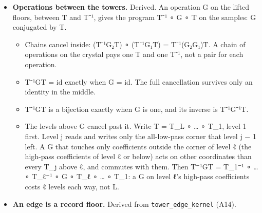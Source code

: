 \begin{itemize}
\begin{itemize}
\item keymath does not see the identity: T⁻¹ ∘ T emitted as steps runs every one of them.
\item In the proved program T is 69 steps (8 field steps and 61) and T⁻¹ is 60. F on the samples needs only the 8 field steps.
\item When the record holds the samples, F on the samples saves every step of T and T⁻¹.
\item When the record holds only the crystal, F ∘ T⁻¹ is the way down to the samples, and T⁻¹'s steps are its price.
\end{itemize}
\item \textbf{Operations between the towers.} Derived. An operation G on the lifted floors, between T and T⁻¹, gives the program T⁻¹ ∘ G ∘ T on the samples: G conjugated by T.

\begin{itemize}
\item Chains cancel inside: (T⁻¹G₂T) ∘ (T⁻¹G₁T) = T⁻¹(G₂G₁)T. A chain of operations on the crystal pays one T and one T⁻¹, not a pair for each operation.
\item T⁻¹GT = id exactly when G = id. The full cancellation survives only an identity in the middle.
\item T⁻¹GT is a bijection exactly when G is one, and its inverse is T⁻¹G⁻¹T.
\item The levels above G cancel past it. Write T = T\_\allowbreak{}L ∘ … ∘ T\_\allowbreak{}1, level 1 first. Level j reads and writes only the all-low-pass corner that level j − 1 left. A G that touches only coefficients outside the corner of level ℓ (the high-pass coefficients of level ℓ or below) acts on other coordinates than every T\_\allowbreak{}j above ℓ, and commutes with them. Then T⁻¹GT = T\_\allowbreak{}1⁻¹ ∘ … ∘ T\_\allowbreak{}ℓ⁻¹ ∘ G ∘ T\_\allowbreak{}ℓ ∘ … ∘ T\_\allowbreak{}1: a G on level ℓ's high-pass coefficients costs ℓ levels each way, not L.
\end{itemize}
\item \textbf{An edge is a record floor.} Derived from \texttt{tower\_\allowbreak{}edge\_\allowbreak{}kernel} (A14).


\end{itemize}

